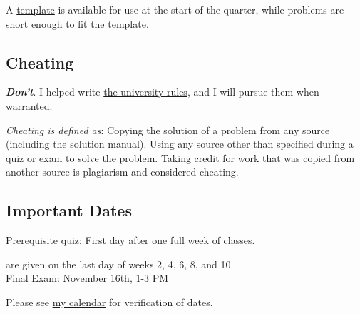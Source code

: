 \documentclass[10pt]{article}
\begin{document}
A \href{http://www.cs.wright.edu/~jslater/classes/materials/frmt.pdf}{template} is available for use at the start of the quarter, while problems are short enough to fit the template. 

\subsection*{Cheating}
\emph{\textbf{Don't}}. I helped write \href{http://www.wright.edu/students/judicial/integrity.html}{the university rules}, and I will pursue them when warranted. 

\emph{Cheating is defined as}: Copying the solution of a problem from any source (including the solution manual). Using any source other than specified during a quiz or exam to solve the problem.  Taking credit for work that was copied from another source is plagiarism and considered cheating. 

\subsection*{Important Dates}
Prerequisite quiz: First day after one full week of classes.

 are given on the last day  of weeks 2, 4, 6, 8, and 10.\\


\noindent{}Final Exam: November 16th, 1-3 PM

\noindent Please see \href{http://www.cs.wright.edu/~jslater/calendar.shtml}{my calendar} for verification of dates.
\end{document}
